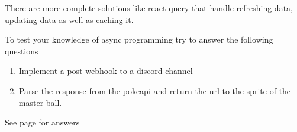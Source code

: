 {There are more complete solutions like react-query that handle refreshing data, updating data as well as caching it.

To test your knowledge of async programming try to answer the following questions

\label{ex:3}
\begin{enumerate}
\item Implement a post webhook to a discord channel
\label{ex:4}
\item Parse the response from the pokeapi and return the url to the sprite of the master ball.
\end{enumerate}

See page \pageref{sol:3} for answers
}\cleanalldata

